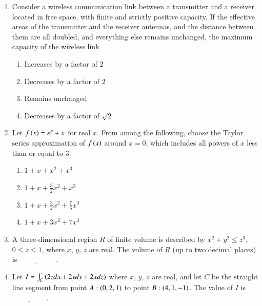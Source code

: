 \documentclass[journal,12pt,onecolumn]{IEEEtran}
\theoremstyle{remark}
\begin{document}
\begin{enumerate}
\hfill {}

\item Consider a wireless communication link between a transmitter and a receiver located in free space, with finite and strictly positive capacity. If the effective areas of the transmitter and the receiver antennas, and the distance between them are all doubled, and everything else remains unchanged, the maximum capacity of the wireless link
\begin{multicols}{2}
\begin{enumerate}
\item Increases by a factor of $2$
\item Decreases by a factor of $2$
\item Remains unchanged
\item Decreases by a factor of $\sqrt{2}$
\end{enumerate}
\end{multicols}
\hfill {}

\item Let $f\left(x\right) = e^x + x$ for real $x$. From among the following, choose the Taylor series approximation of $f\left(x\right)$ around $x = 0$, which includes all powers of $x$ less than or equal to $3$.
\begin{multicols}{2}
\begin{enumerate}
\item $1 + x + x^2 + x^3$
\item $1 + x + \frac{3}{2}x^2 + {x^3}$
\item $1 + x + \frac{3}{2}x^2 + \frac{7}{6}x^3$
\item $1 + x + 3x^2 + 7x^3$
\end{enumerate}
\end{multicols}
\hfill {}

\item A three-dimensional region $R$ of finite volume is described by $x^2 + y^2 \leq z^3$, $0 \leq z \leq 1$, where $x$, $y$, $z$ are real. The volume of $R$ (up to two decimal places) is $\underline{\hspace{2cm}}$ .

\hfill {}

\item Let $I = \int_C \left(2z dx + 2ydy + 2xdz\right)$ where $x$, $y$, $z$ are real, and let $C$ be the straight line segment from point $A: \left(0, 2, 1\right)$ to point $B: \left(4, 1, -1\right)$. The value of $I$ is $\underline{\hspace{2cm}}$.


\end{enumerate}
\end{document}
